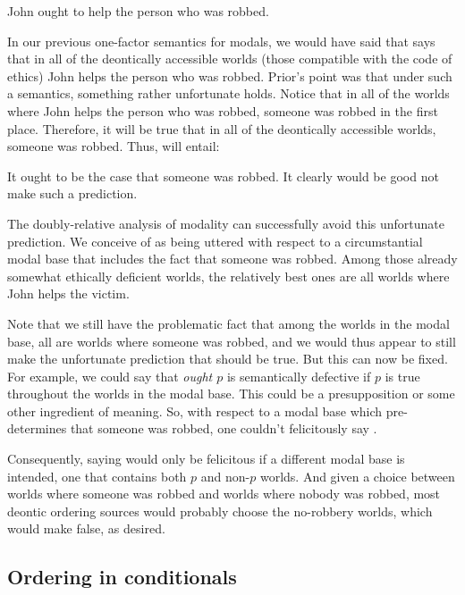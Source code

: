 \ex John ought to help the person who was robbed.\xe

In our previous one-factor semantics for modals, we would have said that
\Last says that in all of the deontically accessible worlds (those compatible
with the code of ethics) John helps the person who was robbed. Prior's point was
that under such a semantics, something rather unfortunate holds. Notice that in
all of the worlds where John helps the person who was robbed, someone was robbed
in the first place. Therefore, it will be true that in all of the deontically
accessible worlds, someone was robbed. Thus, \Last will entail:

\ex It ought to be the case that someone was robbed.\xe
%
It clearly would be good not make such a prediction.

The doubly-relative analysis of modality can successfully avoid this unfortunate
prediction. We conceive of \LLast as being uttered with respect to a
circumstantial modal base that includes the fact that someone was robbed. Among
those already somewhat ethically deficient worlds, the relatively best ones are
all worlds where John helps the victim.

Note that we still have the problematic fact that among the worlds in the modal
base, all are worlds where someone was robbed, and we would thus appear to still
make the unfortunate prediction that \Last should be true. But this can now
be fixed. For example, we could say that \emph{ought $p$} is semantically
defective if $p$ is true throughout the worlds in the modal base. This could
be a presupposition or some other ingredient of meaning. So, with respect to a
modal base which pre-determines that someone was robbed, one couldn't
felicitously say \Last.

Consequently, saying \Last would only be felicitous if a different modal base
is intended, one that contains both $p$ and non-$p$ worlds. And given a
choice between worlds where someone was robbed and worlds where nobody was
robbed, most deontic ordering sources would probably choose the no-robbery
worlds, which would make \Last false, as desired.

\subsection{Ordering in conditionals}
\label{subsec:ordering-conditionals}

